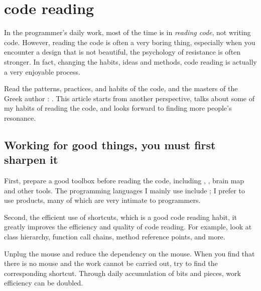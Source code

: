 \chapter{code reading} 
\label{ch:code-reading}

\begin{content}

In the programmer's daily work, most of the time is in \emph{reading code}, not writing code. However, reading the code is often a very boring thing, especially when you encounter a design that is not beautiful, the psychology of resistance is often stronger. In fact, changing the habits, ideas and methods, code reading is actually a very enjoyable process.

Read the patterns, practices, and habits of the code, and the masters of the Greek author : . This article starts from another perspective, talks about some of my habits of reading the code, and looks forward to finding more people's resonance.

\end{content}

\section{Working for good things, you must first sharpen it}

\begin{content}

First, prepare a good toolbox before reading the code, including , , brain map and other tools. The programming languages ​​I mainly use include ; I prefer to use  products, many of which are very intimate to programmers.

Second, the efficient use of shortcuts, which is a good code reading habit, it greatly improves the efficiency and quality of code reading. For example, look at class hierarchy, function call chains, method reference points, and more.

\begin{remark}
Unplug the mouse and reduce the dependency on the mouse. When you find that there is no mouse and the work cannot be carried out, try to find the corresponding shortcut. Through daily accumulation of bits and pieces, work efficiency can be doubled.
\end{remark}

\end{content}

